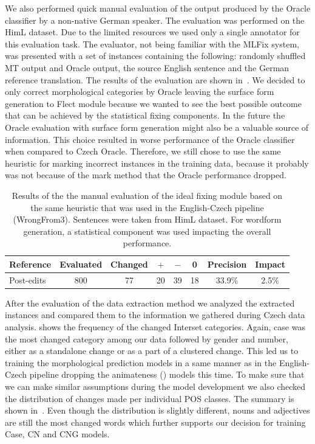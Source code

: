We also performed quick manual evaluation of the output produced by the Oracle classifier by a non-native
German speaker.
The evaluation was performed on the HimL dataset.
Due to the limited
resources we used only a single annotator for this evaluation task. The evaluator, not being familiar
with the MLFix system, was presented with a set of instances containing the following: randomly shuffled MT output and Oracle output,
the source English sentence and the German reference translation. The results of the evaluation are shown in~.
We decided to only correct morphological categories by Oracle leaving the surface form generation to Flect module because
we wanted to see the best possible outcome that can be achieved by the statistical fixing components. In the future
the Oracle evaluation with  surface form generation might also be a valuable source of information.
This choice resulted in worse performance of the Oracle classifier when compared to Czech Oracle.
Therefore,
we still chose to use the same heuristic for marking incorrect instances in the training data, because
it probably was not because of the mark method that the Oracle performance dropped.

\begin{table}[t]
\centering
\small

\begin{tabular}{l|cc|ccc|cc}
Reference  &  Evaluated  &  Changed  &  $+$  &  $-$  &  0  &  Precision  &  Impact  \\
\hline
Post-edits  &  800  &  77  &  20  &  39  &  18  &  33.9\%  &  2.5\%  \\
\end{tabular}
\caption[Manual evaluation of the German Oracle classifier]{
Results of the the manual evaluation of the ideal fixing module based on the same heuristic
that was used in the English-Czech pipeline (WrongFrom3). Sentences were taken from HimL dataset. For wordform generation, a statistical component
was used impacting the overall performance.
}
\label{oracle_de-maneval}
\end{table}

After the evaluation of the data extraction method we analyzed the extracted instances and compared them
to the information we gathered during Czech data analysis.  shows the frequency of the changed Interset
categories. Again, case was the most changed category among our data followed by gender and number, either as a standalone change or
as a part of a clustered change. This led us to training the morphological prediction models in a same manner as in the English-Czech
pipeline dropping the animateness () models this time. To make sure that we can make similar assumptions during
the model development we also checked the distribution of changes made per individual POS classes. The summary is shown in~.
Even though the distribution is slightly different, nouns and adjectives are still the most changed words which further supports
our decision for training Case, CN and CNG models.

